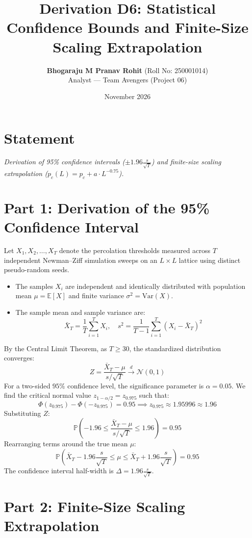 \documentclass[11pt,a4paper]{article}
\title{\textbf{Derivation D6: Statistical Confidence Bounds and Finite-Size Scaling Extrapolation}}
\author{\textbf{Bhogaraju M Pranav Rohit} (Roll No: 250001014) \\ Analyst --- Team Avengers (Project 06)}
\date{November 2026}
\begin{document}
\maketitle

\section{Statement}
\textit{Derivation of 95\% confidence intervals ($\pm 1.96 \frac{s}{\sqrt{T}}$) and finite-size scaling extrapolation ($p_c(L) = p_c + a \cdot L^{-0.75}$).}

\section{Part 1: Derivation of the 95\% Confidence Interval}

Let $X_1, X_2, \dots, X_T$ denote the percolation thresholds measured across $T$ independent Newman--Ziff simulation sweeps on an $L \times L$ lattice using distinct pseudo-random seeds.
\begin{itemize}
    \item The samples $X_i$ are independent and identically distributed with population mean $\mu = \mathbb{E}[X]$ and finite variance $\sigma^2 = \text{Var}(X)$.
    \item The sample mean and sample variance are:
    \[
    \bar{X}_T = \frac{1}{T}\sum_{i=1}^T X_i, \quad s^2 = \frac{1}{T-1}\sum_{i=1}^T (X_i - \bar{X}_T)^2
    \]
\end{itemize}

By the Central Limit Theorem, as $T \ge 30$, the standardized distribution converges:
\[
Z = \frac{\bar{X}_T - \mu}{s / \sqrt{T}} \xrightarrow{d} \mathcal{N}(0, 1)
\]
For a two-sided $95\%$ confidence level, the significance parameter is $\alpha = 0.05$. We find the critical normal value $z_{1 - \alpha/2} = z_{0.975}$ such that:
\[
\Phi(z_{0.975}) - \Phi(-z_{0.975}) = 0.95 \implies z_{0.975} \approx 1.95996 \approx 1.96
\]
Substituting $Z$:
\[
\mathbb{P}\left(-1.96 \le \frac{\bar{X}_T - \mu}{s / \sqrt{T}} \le 1.96\right) = 0.95
\]
Rearranging terms around the true mean $\mu$:
\[
\mathbb{P}\left(\bar{X}_T - 1.96 \frac{s}{\sqrt{T}} \le \mu \le \bar{X}_T + 1.96 \frac{s}{\sqrt{T}}\right) = 0.95
\]
The confidence interval half-width is $\Delta = 1.96 \frac{s}{\sqrt{T}}$.

\section{Part 2: Finite-Size Scaling Extrapolation}
\end{document}
